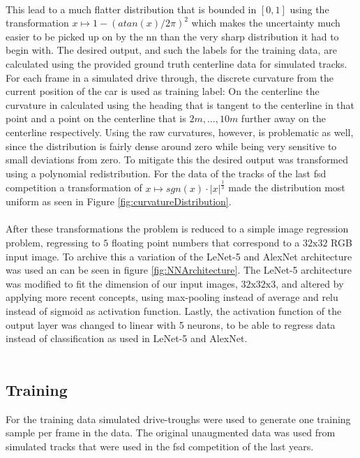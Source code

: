 \\This lead to a much flatter distribution that is bounded in $[0,1]$ using the transformation $x \mapsto 1-(atan(x)/2\pi)^2$ which makes the uncertainty much easier to be picked up on by the \ac{nn}\cite{Sola1997} than the very sharp distribution it had to begin with. 
The desired output, and such the labels for the training data, are calculated using the provided ground truth centerline data for simulated tracks. For each frame in a simulated drive through, the discrete curvature from the current position of the car is used as training label: On the centerline the curvature in calculated using the heading that is tangent to the centerline in that point and a point on the centerline that is $2m, ..., 10m$ further away on the centerline respectively. Using the raw curvatures, however, is problematic as well, since the distribution is fairly dense around zero while being very sensitive to small deviations from zero. To mitigate this the desired output was transformed using a polynomial redistribution. For the data of the tracks of the last \ac{fsd} competition a transformation of $x \mapsto sgn(x)\cdot |x|^\frac{1}{3}$ made the distribution most uniform as seen in Figure \ref{fig:curvatureDistribution}.
\\
\\
After these transformations the problem is reduced to a simple image regression problem, regressing to $5$ floating point numbers that correspond to a $32\text{x}32$ RGB input image. To archive this a variation of the  LeNet-5\cite{Lecun1998} and AlexNet\cite{Alex2012} architecture was used an can be seen in figure \ref{fig:NNArchitecture}. The LeNet-5 architecture was modified to fit the dimension of our input images, $32\text{x}32\text{x}3$, and altered by applying more recent concepts, using max-pooling instead of average and \ac{relu} instead of sigmoid as activation function. Lastly, the activation function of the output layer was changed to linear with 5 neurons, to be able to regress data instead of classification as used in LeNet-5\cite{Lecun1998} and AlexNet\cite{Alex2012}. 
 \\
\\
\subsection{Training}
For the training data simulated drive-troughs were used to generate one training sample per frame in the data. The original unaugmented data was used
from simulated tracks that were used in the \ac{fsd} competition of the last years.